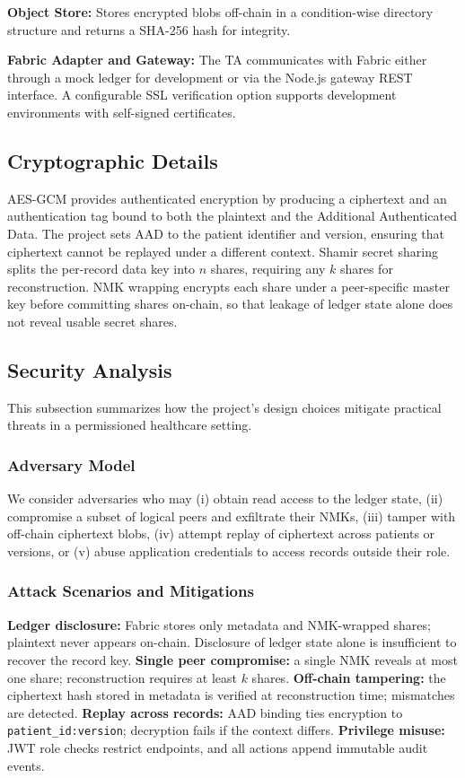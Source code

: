 \documentclass{IEEEtran}
\begin{document}
\textbf{Object Store:} Stores encrypted blobs off-chain in a condition-wise directory structure and returns a SHA-256 hash for integrity.

\textbf{Fabric Adapter and Gateway:} The TA communicates with Fabric either through a mock ledger for development or via the Node.js gateway REST interface. A configurable SSL verification option supports development environments with self-signed certificates.

\subsection{Cryptographic Details}
AES-GCM provides authenticated encryption by producing a ciphertext and an authentication tag bound to both the plaintext and the Additional Authenticated Data. The project sets AAD to the patient identifier and version, ensuring that ciphertext cannot be replayed under a different context. Shamir secret sharing splits the per-record data key into $n$ shares, requiring any $k$ shares for reconstruction. NMK wrapping encrypts each share under a peer-specific master key before committing shares on-chain, so that leakage of ledger state alone does not reveal usable secret shares.

\subsection{Security Analysis}
This subsection summarizes how the project’s design choices mitigate practical threats in a permissioned healthcare setting.

\subsubsection{Adversary Model}
We consider adversaries who may (i) obtain read access to the ledger state, (ii) compromise a subset of logical peers and exfiltrate their NMKs, (iii) tamper with off-chain ciphertext blobs, (iv) attempt replay of ciphertext across patients or versions, or (v) abuse application credentials to access records outside their role.

\subsubsection{Attack Scenarios and Mitigations}
\textbf{Ledger disclosure:} Fabric stores only metadata and NMK-wrapped shares; plaintext never appears on-chain. Disclosure of ledger state alone is insufficient to recover the record key. \textbf{Single peer compromise:} a single NMK reveals at most one share; reconstruction requires at least $k$ shares. \textbf{Off-chain tampering:} the ciphertext hash stored in metadata is verified at reconstruction time; mismatches are detected. \textbf{Replay across records:} AAD binding ties encryption to \texttt{patient\_id:version}; decryption fails if the context differs. \textbf{Privilege misuse:} JWT role checks restrict endpoints, and all actions append immutable audit events.
\end{document}
